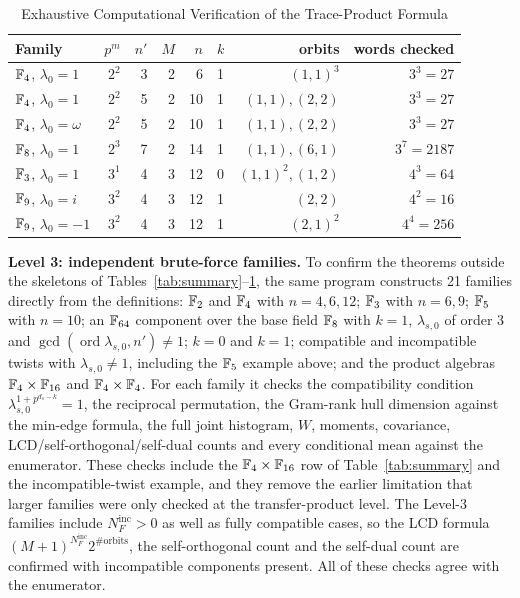 \begin{table}[!t]
\centering
\scriptsize
\setlength{\tabcolsep}{2.5pt}
\caption{Exhaustive Computational Verification of the Trace-Product Formula}
\label{tab:verification}
\begin{tabular}{lrrrrlrr}
\toprule
Family & $p^m$ & $n'$ & $M$ & $n$ & $k$ & orbits & words checked\\
\midrule
$\mathbb F_4$, $\lambda_0=1$ & $2^2$ & 3 & 2 & 6  & 1 & $(1,1)^3$          & $3^3=27$\\
$\mathbb F_4$, $\lambda_0=1$ & $2^2$ & 5 & 2 & 10 & 1 & $(1,1),(2,2)$      & $3^3=27$\\
$\mathbb F_4$, $\lambda_0=\omega$ & $2^2$ & 5 & 2 & 10 & 1 & $(1,1),(2,2)$ & $3^3=27$\\
$\mathbb F_8$, $\lambda_0=1$ & $2^3$ & 7 & 2 & 14 & 1 & $(1,1),(6,1)$      & $3^7=2187$\\
$\mathbb F_3$, $\lambda_0=1$ & $3^1$ & 4 & 3 & 12 & 0 & $(1,1)^2,(1,2)$    & $4^3=64$\\
$\mathbb F_9$, $\lambda_0=i$ & $3^2$ & 4 & 3 & 12 & 1 & $(2,2)$            & $4^2=16$\\
$\mathbb F_9$, $\lambda_0=-1$ & $3^2$ & 4 & 3 & 12 & 1 & $(2,1)^2$         & $4^4=256$\\
\bottomrule
\end{tabular}
\end{table}

\noindent\textbf{Level 3: independent brute-force families.}  To confirm the
theorems outside the skeletons of Tables~\ref{tab:summary}--\ref{tab:verification},
the same program constructs 21 families directly from the definitions:
$\mathbb F_2$ and $\mathbb F_4$ with $n=4,6,12$; $\mathbb F_3$ with $n=6,9$; $\mathbb F_5$ with $n=10$;
an $\mathbb F_{64}$ component over the base field $\mathbb F_8$ with $k=1$,
$\lambda_{s,0}$ of order $3$ and
$\gcd(\operatorname{ord}\lambda_{s,0},n')\neq1$; $k=0$ and $k=1$;
compatible and incompatible twists with $\lambda_{s,0}\neq1$, including the
$\mathbb F_5$ example above; and the product algebras $\mathbb F_4\times\mathbb F_{16}$ and
$\mathbb F_4\times\mathbb F_4$.  For each family it checks the compatibility condition
$\lambda_{s,0}^{1+p^{d_s-k}}=1$, the reciprocal permutation, the Gram-rank
hull dimension against the min-edge formula, the full joint histogram, $W$,
moments, covariance, LCD/self-orthogonal/self-dual counts and every conditional
mean against the enumerator.  These checks include the $\mathbb F_4\times\mathbb F_{16}$ row
of Table~\ref{tab:summary} and the incompatible-twist example, and they remove
the earlier limitation that larger families were only checked at the
transfer-product level.  The Level-3 families include
$N_F^{\mathrm{inc}}>0$ as well as fully compatible cases, so the LCD formula
$(M+1)^{N_F^{\mathrm{inc}}}2^{\#\mathrm{orbits}}$, the self-orthogonal count
and the self-dual count are confirmed with incompatible components present.
All of these checks agree with the enumerator.


